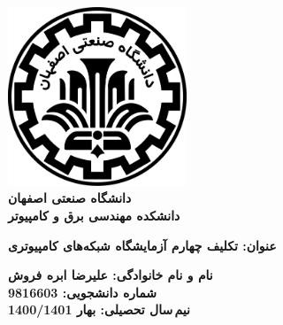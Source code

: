 \begin{titlepage}
\begin{center}
\includegraphics[width=0.4\textwidth]{figures/IUT Logo.png}\\
        
\LARGE
\textbf{دانشگاه صنعتی اصفهان}\\
\textbf{دانشکده مهندسی برق و کامپیوتر}\\
        
\vfill
        
\huge
\textbf{عنوان: تکلیف چهارم آزمایشگاه شبکه‌های کامپیوتری}\\
        
\vfill
        
\LARGE
\textbf{نام و نام خانوادگی: علیرضا ابره فروش}\\
\textbf{شماره دانشجویی: 9816603}\\
\textbf{نیم\,سال تحصیلی: بهار 1400/1401}\\
\end{center}
\end{titlepage}
